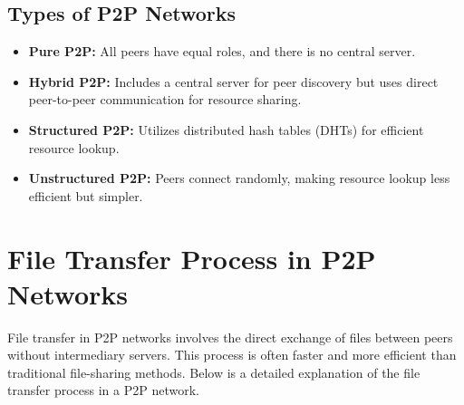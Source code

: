 \documentclass[12pt,a4paper]{article}
\begin{document}
\subsection{Types of P2P Networks}
\begin{itemize}
    \item \textbf{Pure P2P:} All peers have equal roles, and there is no central server.
    \item \textbf{Hybrid P2P:} Includes a central server for peer discovery but uses direct peer-to-peer communication for resource sharing.
    \item \textbf{Structured P2P:} Utilizes distributed hash tables (DHTs) for efficient resource lookup.
    \item \textbf{Unstructured P2P:} Peers connect randomly, making resource lookup less efficient but simpler.
\end{itemize}

\section{File Transfer Process in P2P Networks}

File transfer in P2P networks involves the direct exchange of files between peers without intermediary servers. This process is often faster and more efficient than traditional file-sharing methods. Below is a detailed explanation of the file transfer process in a P2P network.
\end{document}
